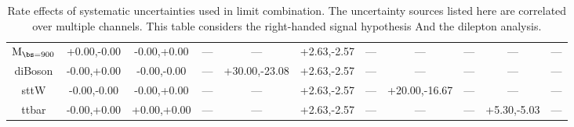 \begin{table}
\begin{center}
\begin{small}
{\begin{tabular}{c||c|c|c|c|c|c|c|c|c|c}
$\mathrm{M_{\bs=900}}$ & +0.00,-0.00 & -0.00,+0.00 & --- & --- & +2.63,-2.57 & --- & --- & --- & --- & ---\\  
diBoson & -0.00,+0.00 & -0.00,-0.00 & --- & +30.00,-23.08 & +2.63,-2.57 & --- & --- & --- & --- & ---\\  
sttW & -0.00,-0.00 & -0.00,+0.00 & --- & --- & +2.63,-2.57 & --- & +20.00,-16.67 & --- & --- & ---\\  
ttbar & -0.00,+0.00 & +0.00,+0.00 & --- & --- & +2.63,-2.57 & --- & --- & --- & +5.30,-5.03 & ---\\ 
\hline
\end{tabular}
}
\caption{Rate effects of systematic uncertainties used in limit combination.  The uncertainty sources listed here are correlated over multiple channels.  This table considers the right-handed signal hypothesis
And the dilepton analysis.}
\label{table:bsRsysCoD}

\end{small}
\end{center}
\end{table}





